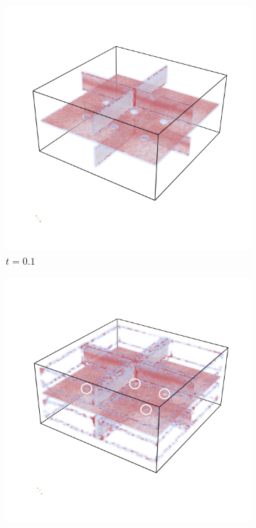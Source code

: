 \begin{figure}
    \centering
    \begin{subfigure}[]{0.75\textwidth}
        \includegraphics[width=\textwidth]{Images/MCridge.png}
        \caption{$t=0.1$}
        \label{fig:MCridge}
    \end{subfigure}
    \begin{subfigure}[]{0.49\textwidth}
        \includegraphics[width=\textwidth]{Images/MCridgetol.png}

\end{subfigure}
\end{figure}
